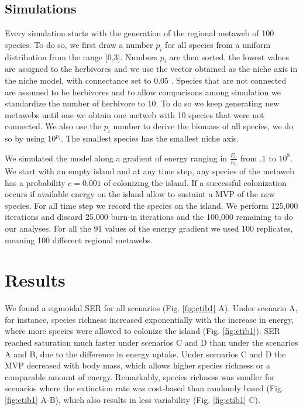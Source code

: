 \subsection{Simulations}\label{simulations}

Every simulation starts with the generation of the regional metaweb of
100 species. To do so, we first draw a number \(p_i\) for all species
from a uniform distribution from the range {[}0,3{]}. Numbers \(p_i\)
are then sorted, the lowest values are assigned to the herbivores and we
use the vector obtained as the niche axis in the niche model, with
connectance set to \(0.05\) \citep{Williams2000}. Species that are not
connected are assumed to be herbivores and to allow comparisons among
simulation we standardize the number of herbivore to 10. To do so we
keep generating new metawebs until one we obtain one metweb with 10
species that were not connected. We also use the \(p_i\) number to
derive the biomass of all species, we do so by using \(10^{p_i}\). The
smallest species has the smallest niche axis.

We simulated the model along a gradient of energy ranging in
\(\frac{E_0}{n_0}\) from \(.1\) to \(10^8\). We start with an empty
island and at any time step, any species of the metaweb has a
probability \(c=0.001\) of colonizing the island. If a successful
colonization occurs if available energy on the island allow to sustaint
a MVP of the new species. For all time step we record the species on the
island. We perform 125,000 iterations and discard 25,000 burn-in
iterations and the 100,000 remaining to do our analyses. For all the 91
values of the energy gradient we used 100 replicates, meaning 100
different regional metawebs.



\section{Results}\label{results}

We found a sigmoidal SER for all scenarios (Fig. \ref{fig:etib1} A).
Under scenario A, for instance, species richness increased exponentially
with the increase in energy, where more species were allowed to colonize
the island (Fig. \ref{fig:etib1}). SER reached saturation much faster
under scenarios C and D than under the scenarios A and B, due to the
difference in energy uptake. Under scenarios C and D the MVP decreased
with body mass, which allows higher species richness or a comparable
amount of energy. Remarkably, species richness was smaller for scenarios
where the extinction rate was cost-based than randomly based (Fig.
\ref{fig:etib1} A-B), which also results in less variability (Fig.
\ref{fig:etib1} C).

